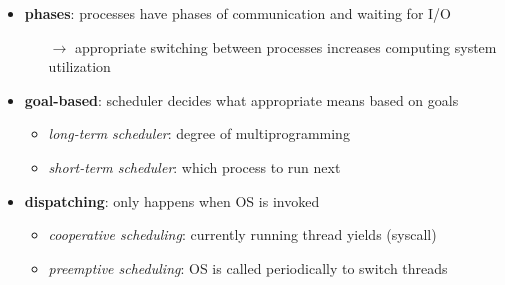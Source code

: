 \begin{summary}
  \begin{itemize}
    \item \textbf{phases}: processes have phases of communication and waiting for I/O
    \begin{itemize}
      \item[$ \to $] appropriate switching between processes increases computing system utilization
    \end{itemize}
    \item \textbf{goal-based}: scheduler decides what appropriate means based on goals
    \begin{itemize}
      \item \emph{long-term scheduler}: degree of multiprogramming
      \item \emph{short-term scheduler}: which process to run next
    \end{itemize}
    \item \textbf{dispatching}: only happens when OS is invoked
    \begin{itemize}
      \item \emph{cooperative scheduling}: currently running thread yields (syscall)
      \item \emph{preemptive scheduling}: OS is called periodically to switch threads
    \end{itemize}
  \end{itemize}
\end{summary}